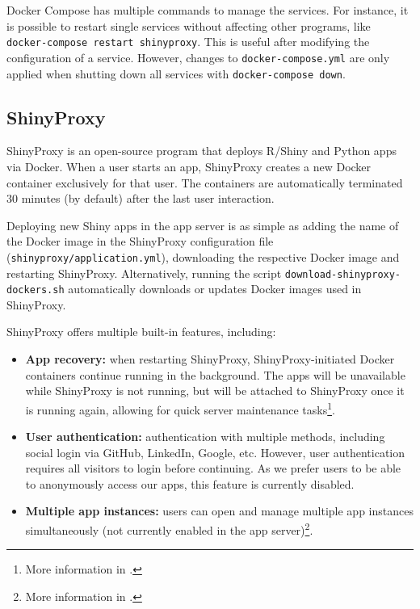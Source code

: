 Docker Compose has multiple commands to manage the services. For instance, it is possible to restart single services without affecting other programs, like \texttt{docker-compose restart shinyproxy}. This is useful after modifying the configuration of a service. However, changes to \texttt{docker-compose.yml} are only applied when shutting down all services with \texttt{docker-compose down}.


\subsection{ShinyProxy}

ShinyProxy is an open-source program that deploys R/Shiny and Python apps via Docker. When a user starts an app, ShinyProxy creates a new Docker container exclusively for that user. The containers are automatically terminated 30 minutes (by default) after the last user interaction.

Deploying new Shiny apps in the app server is as simple as adding the name of the Docker image in the ShinyProxy configuration file (\texttt{shinyproxy/application.yml}), downloading the respective Docker image and restarting ShinyProxy. Alternatively, running the script \texttt{download-shinyproxy-dockers.sh} automatically downloads or updates Docker images used in ShinyProxy.

ShinyProxy offers multiple built-in features, including:

\begin{itemize}
    \item \textbf{App recovery:} when restarting ShinyProxy, ShinyProxy-initiated Docker containers continue running in the background. The apps will be unavailable while ShinyProxy is not running, but will be attached to ShinyProxy once it is running again, allowing for quick server maintenance tasks\footnote{More information in .}.
    \item \textbf{User authentication:} authentication with multiple methods, including social login via GitHub, LinkedIn, Google, etc. However, user authentication requires all visitors to login before continuing. As we prefer users to be able to anonymously access our apps, this feature is currently disabled.
	\item \textbf{Multiple app instances:} users can open and manage multiple app instances simultaneously (not currently enabled in the app server)\footnote{More information in .}.
\end{itemize}

